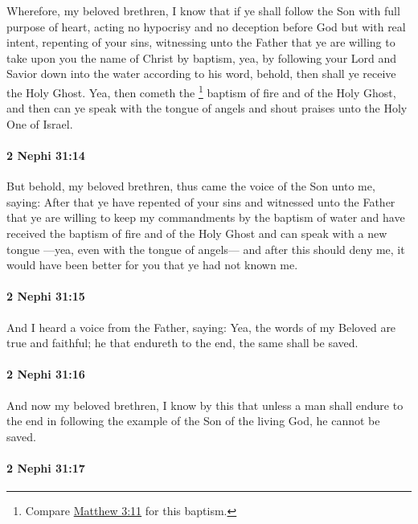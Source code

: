 			Wherefore, my beloved brethren,
			I know that if ye shall follow the Son with full purpose of heart,
			acting no hypocrisy and no deception before God but with real intent,
			repenting of your sins,
			witnessing unto the Father that ye are willing
			to take upon you the name of Christ by baptism,
			yea, by following your Lord and Savior down into the water according to his word,
			behold, then shall ye receive the Holy Ghost.
			Yea, then cometh the
				\footnote{%
					Compare \hyperref[MATTHEW-3-11]{Matthew 3:11} for this baptism.
					}%
			baptism of fire and of the Holy Ghost,
			and then can ye speak with the tongue of angels
			and shout praises unto the Holy One of Israel.

		\paragraph{2 Nephi 31:14} %
			\label{2NEPHI-31-14}

			But behold, my beloved brethren,
			thus came the voice of the Son unto me, saying:
			After that ye have repented of your sins and witnessed unto the Father
			that ye are willing to keep my commandments by the baptism of water
			and have received the baptism of fire and of the Holy Ghost
			and can speak with a new tongue
			---yea, even with the tongue of angels---
			and after this should deny me,
			it would have been better for you that ye had not known me.

		\paragraph{2 Nephi 31:15} %
			\label{2NEPHI-31-15}

			And I heard a voice from the Father, saying:
			Yea, the words of my Beloved are true and faithful;
			he that endureth to the end, the same shall be saved.

		\paragraph{2 Nephi 31:16} %
			\label{2NEPHI-31-16}

			And now my beloved brethren,
			I know by this that unless a man shall endure to the end
			in following the example of the Son of the living God,
			he cannot be saved.

		\paragraph{2 Nephi 31:17} %
			\label{2NEPHI-31-17}


